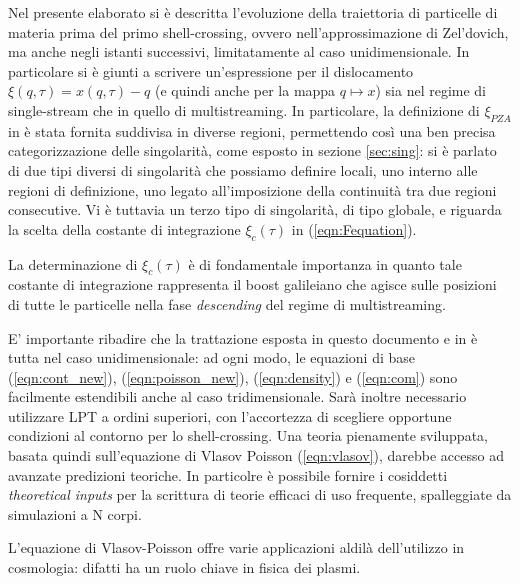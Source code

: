 Nel presente elaborato si è descritta l'evoluzione della traiettoria di 
particelle di materia prima del primo shell-crossing, ovvero nell'approssimazione di
Zel'dovich, ma anche negli istanti successivi, limitatamente al caso unidimensionale. 
In particolare si è giunti a scrivere un'espressione per il dislocamento $\xi(q, \tau) = x(q,\tau)-q$
(e quindi anche per la mappa $q\mapsto x$) sia nel regime di single-stream che in quello di multistreaming.
In particolare, la definizione di $\xi_{PZA}$ in è stata fornita suddivisa in diverse regioni, permettendo così 
una ben precisa categorizzazione delle singolarità, come esposto in sezione \ref{sec:sing}: si è 
parlato di due tipi diversi di singolarità che possiamo definire locali, uno interno alle 
regioni di definizione, uno legato all'imposizione della continuità tra due regioni consecutive.
Vi è tuttavia un terzo tipo di singolarità, di tipo globale, e riguarda la scelta della
costante di integrazione $\xi_c(\tau)$ in (\ref{eqn:Fequation}).

\begin{comment}
    qui non ben chiaro cosa si intende per spatial average, e che tipo di singolarità è la terza
\end{comment}

La determinazione di $\xi_c(\tau)$ è di fondamentale importanza in quanto tale costante 
di integrazione rappresenta il boost galileiano che agisce sulle posizioni di tutte le 
particelle nella fase \textit{descending} del regime di multistreaming.

E' importante ribadire che la trattazione esposta in questo documento e in \cite{rampf}
è tutta nel caso unidimensionale: ad ogni modo, le equazioni di base (\ref{eqn:cont_new}),
(\ref{eqn:poisson_new}), (\ref{eqn:density}) e (\ref{eqn:com}) sono facilmente estendibili
anche al caso tridimensionale. Sarà inoltre necessario utilizzare LPT a ordini superiori,
con l'accortezza di scegliere opportune condizioni al contorno per lo shell-crossing.
Una teoria pienamente sviluppata, basata quindi sull'equazione di Vlasov Poisson 
(\ref{eqn:vlasov}), darebbe accesso ad avanzate predizioni teoriche. In particolre è possibile
fornire i cosiddetti \textit{theoretical inputs} per la scrittura di teorie efficaci di uso 
frequente, spalleggiate da simulazioni a N corpi.

L'equazione di Vlasov-Poisson offre varie applicazioni aldilà dell'utilizzo in 
cosmologia: difatti ha un ruolo chiave in fisica dei plasmi.